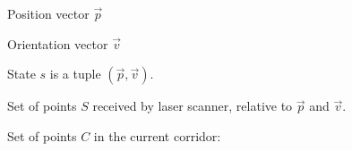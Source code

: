 Position vector $\overrightarrow{p}$

Orientation vector $\overrightarrow{v}$

State $s$ is a tuple $(\overrightarrow{p}, \overrightarrow{v})$.

Set of points $S$ received by laser scanner, relative to
$\overrightarrow{p}$ and $\overrightarrow{v}$.

Set of points $C$ in the current corridor:
